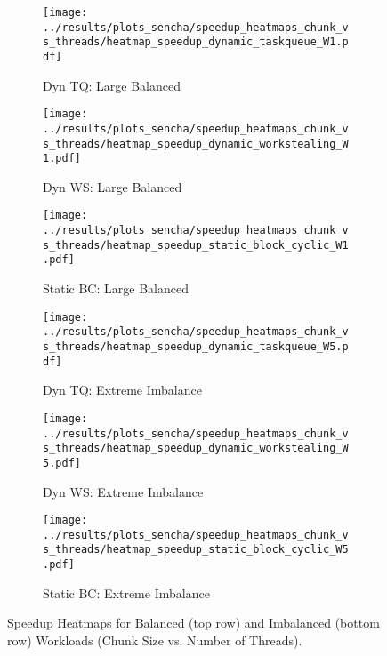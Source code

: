 \documentclass[10pt]{article}
\begin{document}
\begin{figure}[H]
    \centering
    \begin{subfigure}[b]{0.32\textwidth}
        \centering
        \texttt{[image: ../results/plots\_sencha/speedup\_heatmaps\_chunk\_vs\_threads/heatmap\_speedup\_dynamic\_taskqueue\_W1.pdf]}
        \caption{Dyn TQ: Large Balanced}
        \label{fig:heatmap_dynamic_TQ_balanced}
    \end{subfigure}
    \hfill
    \begin{subfigure}[b]{0.32\textwidth}
        \centering
        \texttt{[image: ../results/plots\_sencha/speedup\_heatmaps\_chunk\_vs\_threads/heatmap\_speedup\_dynamic\_workstealing\_W1.pdf]}
        \caption{Dyn WS: Large Balanced}
        \label{fig:heatmap_dynamic_WS_balanced}
    \end{subfigure}
    \hfill
    \begin{subfigure}[b]{0.32\textwidth}
        \centering
        \texttt{[image: ../results/plots\_sencha/speedup\_heatmaps\_chunk\_vs\_threads/heatmap\_speedup\_static\_block\_cyclic\_W1.pdf]}
        \caption{Static BC: Large Balanced}
        \label{fig:heatmap_sbc_balanced}
    \end{subfigure}

    \vspace{0.5em}

    \begin{subfigure}[b]{0.32\textwidth}
        \centering
        \texttt{[image: ../results/plots\_sencha/speedup\_heatmaps\_chunk\_vs\_threads/heatmap\_speedup\_dynamic\_taskqueue\_W5.pdf]}
        \caption{Dyn TQ: Extreme Imbalance}
        \label{fig:heatmap_dynamic_TQ_imbalance}
    \end{subfigure}
    \hfill
    \begin{subfigure}[b]{0.32\textwidth}
        \centering
        \texttt{[image: ../results/plots\_sencha/speedup\_heatmaps\_chunk\_vs\_threads/heatmap\_speedup\_dynamic\_workstealing\_W5.pdf]}
        \caption{Dyn WS: Extreme Imbalance}
        \label{fig:heatmap_dynamic_WS_imbalance}
    \end{subfigure}
    \hfill
    \begin{subfigure}[b]{0.32\textwidth}
        \centering
        \texttt{[image: ../results/plots\_sencha/speedup\_heatmaps\_chunk\_vs\_threads/heatmap\_speedup\_static\_block\_cyclic\_W5.pdf]}
        \caption{Static BC: Extreme Imbalance}
        \label{fig:heatmap_sbc_imbalance}
    \end{subfigure}
    \caption{Speedup Heatmaps for Balanced (top row) and Imbalanced (bottom row) Workloads (Chunk Size vs. Number of Threads).}
    \label{fig:heatmaps_all}
\end{figure}
\end{document}
